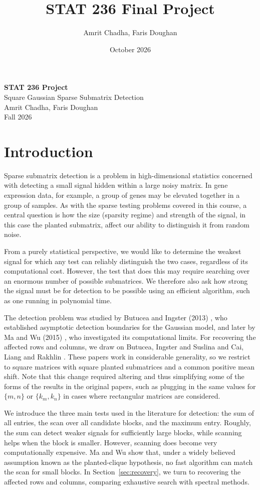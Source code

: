 \documentclass[12pt]{article}
\title{STAT 236 Final Project}
\author{Amrit Chadha, Faris Doughan}
\date{October 2026}
\begin{document}
\begin{titlepage}
    \centering
    \vspace*{0.24\textheight}
    {\Huge \textbf{STAT 236 Project}}\\[1.5em]
    {\Large Square Gaussian Sparse Submatrix Detection}\\[3em]
    {\large Amrit Chadha, Faris Doughan}\\[1em]
    {\large Fall 2026}
\end{titlepage}

\section{Introduction}

Sparse submatrix detection is a problem in high-dimensional statistics
concerned with detecting a small signal hidden within a large
noisy matrix. In gene expression data, for example, a group of genes may
be elevated together in a group of samples. As with the sparse testing
problems covered in this course, a central question is how the size (sparsity regime) and strength of
the signal, in this case the planted submatrix, affect our ability
to distinguish it from random noise. 

 From a purely
statistical perspective, we would like to determine the weakest signal
for which any test can reliably distinguish the two cases,
regardless of its computational cost. However, the test that does this
may require searching over an enormous number of possible submatrices.
We therefore also ask how strong the signal must be for detection to be
possible using an efficient algorithm, such as one running in polynomial
time.

The detection problem was studied by Butucea and Ingster (2013)
\cite{BI2013}, who established asymptotic detection boundaries for the
Gaussian model, and later by Ma and Wu (2015) \cite{MW2015}, who
investigated its computational limits. For recovering the affected rows
and columns, we draw on Butucea, Ingster and Suslina \cite{BIS2015} and
Cai, Liang and Rakhlin \cite{CLR2017}. These papers work in considerable
generality, so we restrict to square
matrices with square planted submatrices and a common positive mean
shift. Note that this change required altering and thus simplifying some of the forms of the results in the original papers, such as plugging in the same values for $\{m,n\}$ or $\{k_m,k_n\}$ in cases where rectangular matrices are considered.

We introduce the three main tests used in the literature for detection: the sum of
all entries, the scan over all candidate blocks, and the maximum entry. Roughly, the sum can detect weaker signals for sufficiently large blocks, while scanning helps when the block is smaller. However,  scanning does become very computationally expensive. Ma and Wu show that, under a widely believed assumption known as the planted-clique hypothesis, no fast algorithm can match the scan for small blocks. In Section~\ref{sec:recovery}, we turn to recovering the affected rows and columns, comparing exhaustive search with spectral methods.
\end{document}
